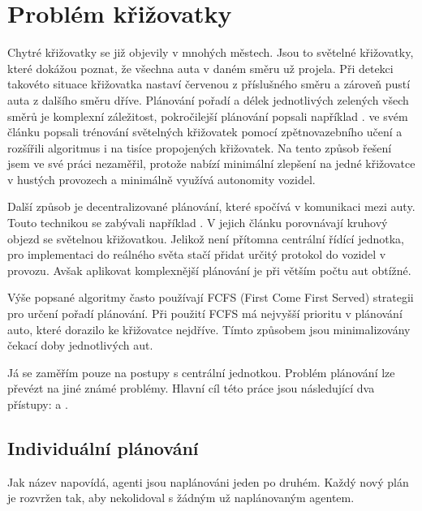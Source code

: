 \chapter{Problém křižovatky}\label{ch:problem}

Chytré křižovatky se již objevily v mnohých městech.
Jsou to světelné křižovatky, které dokážou poznat, že všechna auta v daném směru už projela.
Při detekci takovéto situace křižovatka nastaví červenou z příslušného směru a zároveň pustí auta z dalšího směru dříve.
Plánování pořadí a délek jednotlivých zelených všech směrů je komplexní záležitost, pokročilejší plánování popsali například \citet*{Goldstein}.
\citet*{Liang} ve svém článku popsali trénování světelných křižovatek pomocí zpětnovazebního učení a rozšířili algoritmus i na tisíce propojených křižovatek.
Na tento způsob řešení jsem ve své práci nezaměřil, protože nabízí minimální zlepšení na jedné křižovatce v hustých provozech a minimálně využívá autonomity vozidel.

Další způsob je decentralizované plánování, které spočívá v komunikaci mezi auty.
Touto technikou se zabývali například \citet*{Wu}.
V jejich článku porovnávají kruhový objezd se světelnou křižovatkou.
Jelikož není přítomna centrální řídící jednotka, pro implementaci do reálného světa stačí přidat určitý protokol do vozidel v provozu.
Avšak aplikovat komplexnější plánování je při větším počtu aut obtížné.

Výše popsané algoritmy často používají FCFS\label{str:fcfs} (First Come First Served) strategii pro určení pořadí plánování.
Při použití FCFS má nejvyšší prioritu v plánování auto, které dorazilo ke křižovatce nejdříve.
Tímto způsobem jsou minimalizovány čekací doby jednotlivých aut.

Já se zaměřím pouze na postupy s centrální jednotkou.
Problém plánování lze převézt na jiné známé problémy.
Hlavní cíl této práce jsou následující dva přístupy: \emph{} a \emph{}.

\section{Individuální plánování}\label{sec:individualni_planovani}

Jak název napovídá, agenti jsou naplánováni jeden po druhém.
Každý nový plán je rozvržen tak, aby nekolidoval s žádným už naplánovaným agentem.

